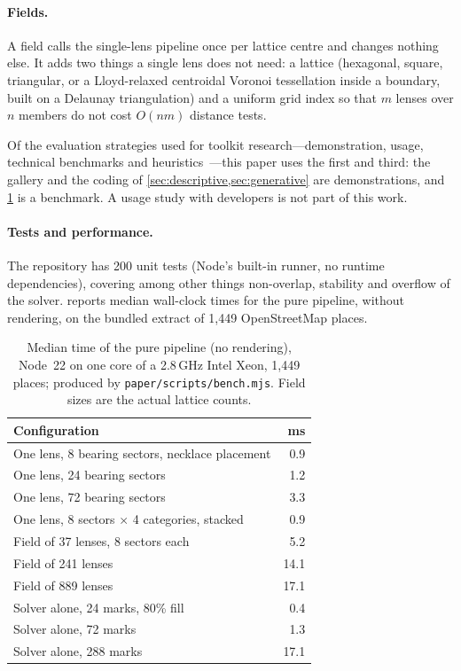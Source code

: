 \paragraph{Fields.} A field calls the single-lens pipeline once per lattice
centre and changes nothing else. It adds two things a single lens does not
need: a lattice (hexagonal, square, triangular, or a Lloyd-relaxed centroidal
Voronoi tessellation inside a boundary, built on a Delaunay triangulation) and a
uniform grid index so that $m$ lenses over $n$ members do not cost $O(nm)$
distance tests.

Of the evaluation strategies used for toolkit research---demonstration,
usage, technical benchmarks and heuristics~\cite{ledo2018toolkits}---this paper
uses the first and third: the gallery and the coding of
\cref{sec:descriptive,sec:generative} are demonstrations, and
\cref{tab:timing} is a benchmark. A usage study with developers is not part of
this work.

\paragraph{Tests and performance.} The repository has 200 unit tests (Node's
built-in runner, no runtime dependencies), covering among other things
non-overlap, stability and overflow of the solver.  reports
median wall-clock times for the pure pipeline, without rendering, on the bundled
extract of 1{,}449 OpenStreetMap places.

\begin{table}[t]
  \centering
  \small
  \caption{Median time of the pure pipeline (no rendering), Node~22 on one
  core of a 2.8\,GHz Intel Xeon, 1{,}449 places; produced by
  \texttt{paper/scripts/bench.mjs}. Field sizes are the actual lattice counts.}
  \label{tab:timing}
  \begin{tabular}{@{}lr@{}}
    \toprule
    Configuration & ms \\
    \midrule
    One lens, 8 bearing sectors, necklace placement & 0.9 \\
    One lens, 24 bearing sectors & 1.2 \\
    One lens, 72 bearing sectors & 3.3 \\
    One lens, 8 sectors $\times$ 4 categories, stacked & 0.9 \\
    Field of 37 lenses, 8 sectors each & 5.2 \\
    Field of 241 lenses & 14.1 \\
    Field of 889 lenses & 17.1 \\
    \midrule
    Solver alone, 24 marks, 80\% fill & 0.4 \\
    Solver alone, 72 marks & 1.3 \\
    Solver alone, 288 marks & 17.1 \\
    \bottomrule
  \end{tabular}
\end{table}

